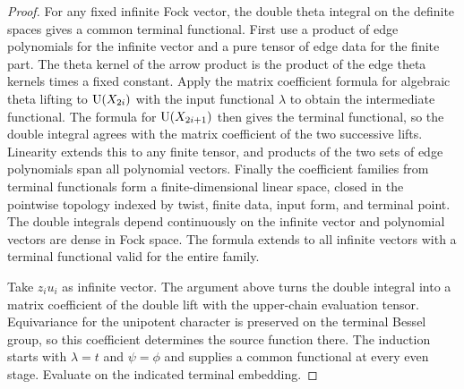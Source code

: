 \begin{proof}
For any fixed infinite Fock vector, the double theta integral on the definite spaces gives a common terminal functional. First use a product of edge polynomials for the infinite vector and a pure tensor of edge data for the finite part. The theta kernel of the arrow product is the product of the edge theta kernels times a fixed constant. Apply the matrix coefficient formula for algebraic theta lifting to $\operatorname{U}(X_{2i})$ with the input functional $\lambda$ to obtain the intermediate functional. The formula for $\operatorname{U}(X_{2i+1})$ then gives the terminal functional, so the double integral agrees with the matrix coefficient of the two successive lifts. Linearity extends this to any finite tensor, and products of the two sets of edge polynomials span all polynomial vectors. Finally the coefficient families from terminal functionals form a finite-dimensional linear space, closed in the pointwise topology indexed by twist, finite data, input form, and terminal point. The double integrals depend continuously on the infinite vector and polynomial vectors are dense in Fock space. The formula extends to all infinite vectors with a terminal functional valid for the entire family.

Take $z_i u_i$ as infinite vector. The argument above turns the double integral into a matrix coefficient of the double lift with the upper-chain evaluation tensor. Equivariance for the unipotent character is preserved on the terminal Bessel group, so this coefficient determines the source function there. The induction starts with $\lambda=t$ and $\psi=\phi$ and supplies a common functional at every even stage. Evaluate on the indicated terminal embedding.
\end{proof}

